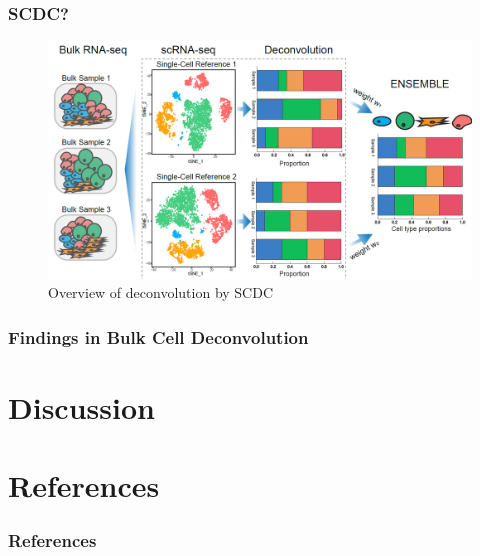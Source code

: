 \documentclass{beamer}
\begin{document}
    \begin{frame}
        \frametitle{SCDC?}

        \begin{figure}
            \includegraphics[width=\linewidth]{figures/Workflow/SCDC.png}
            \caption{Overview of deconvolution by SCDC \protect\cite{SCDC1}}
        \end{figure}
    \end{frame}

    \begin{frame}
        \frametitle{Findings in Bulk Cell Deconvolution}
    \end{frame}

    \section{Discussion}

    \section{References}
    \begin{frame}[allowframebreaks]
        \frametitle{References}
        
        
    \end{frame}
\end{document}
